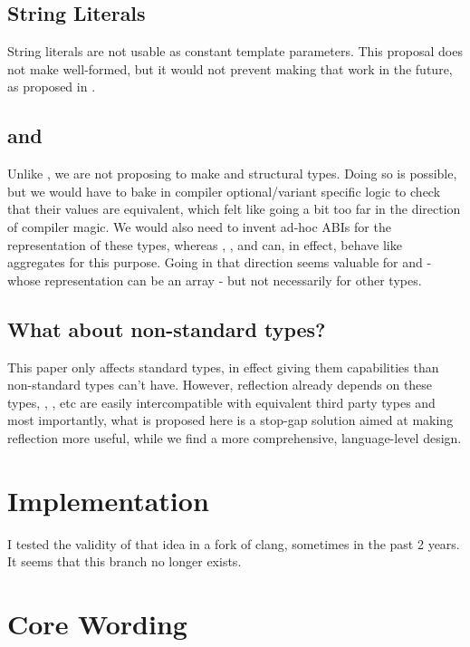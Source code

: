 \documentclass{wg21}
\begin{document}
\subsection{String Literals}

String literals are not usable as constant template parameters. This proposal does not make  well-formed, but it would not prevent making that work in the future, as proposed in .


\subsection{ and }

Unlike , we are not proposing to make  and  structural types.
Doing so is possible, but we would have to bake in compiler optional/variant specific logic to check that their values are equivalent,
which felt like going a bit too far in the direction of compiler magic.
We would also need to invent ad-hoc ABIs for the representation of these types, whereas , , and 
can, in effect, behave like aggregates for this purpose.
Going in that direction seems valuable for  and  - whose representation can be an array - but not necessarily for other types.

\subsection{What about non-standard types?}

This paper only affects standard types, in effect giving them capabilities than non-standard types can't have. However, reflection already depends on these types, , , etc are easily intercompatible with equivalent third party types and most importantly, what is proposed here is a stop-gap solution aimed at making reflection more useful, while we find a more comprehensive, language-level design.

\section{Implementation}

I tested the validity of that idea in a fork of clang, sometimes in the past 2 years. It seems that this branch no longer exists.

\section{Core Wording}
\end{document}
